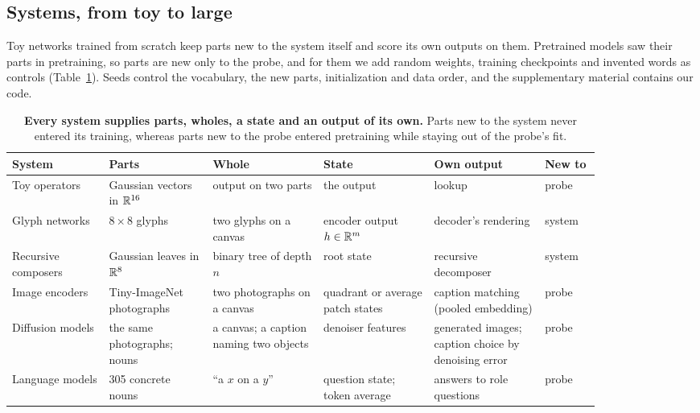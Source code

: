 \subsection{Systems, from toy to large}

Toy networks trained from scratch keep parts new to the system itself and score its own outputs on them. Pretrained models saw their parts in pretraining, so parts are new only to the probe, and for them we add random weights, training checkpoints and invented words as controls (Table~\ref{tab:systems}). Seeds control the vocabulary, the new parts, initialization and data order, and the supplementary material contains our code.

\begin{table}[t]
  \centering
  \small
  \caption{\textbf{Every system supplies parts, wholes, a state and an output of its own.} Parts new to the system never entered its training, whereas parts new to the probe entered pretraining while staying out of the probe's fit.}
  \label{tab:systems}
  \begin{tabular}{@{}p{0.14\linewidth}p{0.15\linewidth}p{0.16\linewidth}p{0.16\linewidth}p{0.16\linewidth}p{0.08\linewidth}@{}}
    \toprule
    System & Parts & Whole & State & Own output & New to \\
    \midrule
    Toy operators & Gaussian vectors in $\mathbb{R}^{16}$ & output on two parts & the output & lookup & probe \\
    Glyph networks & $8 \times 8$ glyphs & two glyphs on a canvas & encoder output $h \in \mathbb{R}^m$ & decoder's rendering & system \\
    Recursive composers & Gaussian leaves in $\mathbb{R}^8$ & binary tree of depth $n$ & root state & recursive decomposer & system \\
    Image encoders & Tiny-ImageNet photographs & two photographs on a canvas & quadrant or average patch states & caption matching (pooled embedding) & probe \\
    Diffusion models & the same photographs; nouns & a canvas; a caption naming two objects & denoiser features & generated images; caption choice by denoising error & probe \\
    Language models & 305 concrete nouns & ``a $x$ on a $y$'' & question state; token average & answers to role questions & probe \\
    \bottomrule
  \end{tabular}
\end{table}

